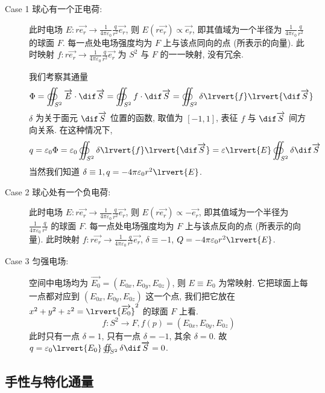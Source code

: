\documentclass[9pt,a4paper,twoside]{../rho-class/rho}
\renewcommand{\vec}{\overrightarrow}
\begin{document}
\begin{description}
    \item[Case 1 球心有一个正电荷:]
        此时电场 $E: r \vec{e_r} \to \frac{1}{4 \pi \varepsilon_0} \frac{q}{r^2} \vec{e_r}$,
        则 $E(r \vec{e_r}) \propto \vec{e_r}$,
        即其值域为一个半径为 $\frac{1}{4 \pi \varepsilon_0} \frac{q}{r^2}$ 的球面 $F$.
        每一点处电场强度均为 $F$ 上与该点同向的点 (所表示的向量).
        此时映射 $f: r \vec{e_r} \to \frac{1}{4 \pi \varepsilon_0} \frac{q}{r^2} \vec{e_r}$ 为 $S^2$ 与 $F$ 的一一映射, 没有冗余.

        我们考察其通量
        \[ \Phi = \oiint_{S^2} \vec{E} \cdot \dif \vec{S} = \oiint_{S^2} f \cdot \dif \vec{S} = \oiint_{S^2} \delta \lrvert{f} \lrvert{\dif \vec{S}} \]
        $\delta$ 为关于面元 $\dif \vec{S}$ 位置的函数, 取值为 $[-1, 1]$, 表征 $f$ 与 $\dif \vec{S}$ 间方向关系.
        在这种情况下,
        \[ q = \varepsilon_0 \Phi = \varepsilon_0 \oiint_{S^2} \delta \lrvert{f} \lrvert{\dif \vec{S}} = \varepsilon \lrvert{E} \oiint_{S^2} \delta \dif \vec{S} \]
        当然我们知道 $\delta \equiv 1, q = -4 \pi \varepsilon_0 r^2 \lrvert{E}$.

    \item[Case 2 球心处有一个负电荷:]
        此时电场 $E: r \vec{e_r} \to \frac{1}{4 \pi \varepsilon_0} \frac{q}{r^2} \vec{e_r}$,
        则 $E(r \vec{e_r}) \propto -\vec{e_r}$,
        即其值域为一个半径为 $\frac{1}{4 \pi \varepsilon_0} \frac{q}{r^2}$ 的球面 $F$.
        每一点处电场强度均为 $F$ 上与该点反向的点 (所表示的向量).
        此时映射 $f: r \vec{e_r} \to \frac{1}{4 \pi \varepsilon_0} \frac{q}{r^2} \vec{e_r}$,
        $\delta \equiv -1$, $Q = -4 \pi \varepsilon_0 r^2 \lrvert{E}$.
    
    \item[Case 3 匀强电场:]
        空间中电场均为 $\vec{E_0} = (E_{0x}, E_{0y}, E_{0z})$, 则 $E \equiv E_0$ 为常映射.
        它把球面上每一点都对应到 $(E_{0x}, E_{0y}, E_{0z})$ 这一个点,
        我们把它放在 $x^2 + y^2 + z^2 = \lrvert{\vec{E_0}}^2$ 的球面 $F$ 上看.
        \[ f: S^2 \to F, f(p) = (E_{0x}, E_{0y}, E_{0z}) \]
        此时只有一点 $\delta = 1$, 只有一点 $\delta = -1$, 其余 $\delta = 0$.
        故 $q = \varepsilon_0 \lrvert{E_0} \oiint_{S^2} \delta \dif \vec{S} = 0$.
\end{description}

\subsection{手性与特化通量} \label{subsec:chirality-and-specialized-flux}
\end{document}
